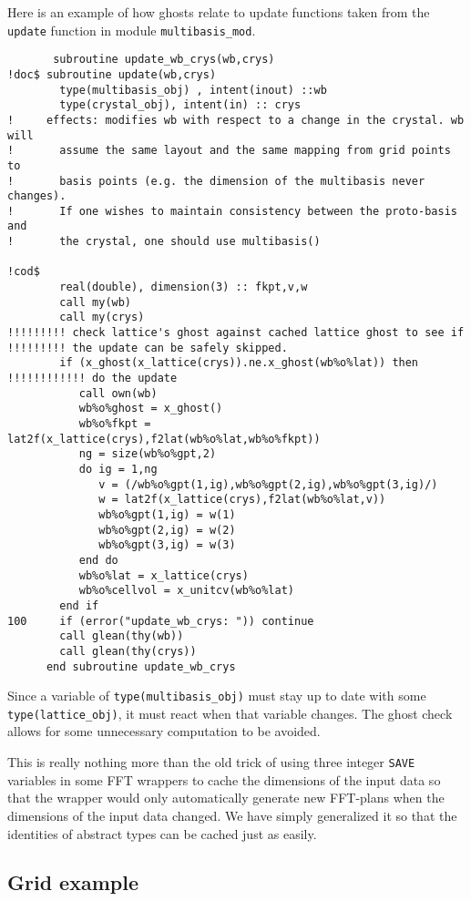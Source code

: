 Here is an example of how ghosts relate to update functions taken from the
\verb+update+ function in module \verb+multibasis_mod+.
\begin{verbatim}
       subroutine update_wb_crys(wb,crys)
!doc$ subroutine update(wb,crys)
        type(multibasis_obj) , intent(inout) ::wb
        type(crystal_obj), intent(in) :: crys
!     effects: modifies wb with respect to a change in the crystal. wb will
!       assume the same layout and the same mapping from grid points to
!       basis points (e.g. the dimension of the multibasis never changes).  
!       If one wishes to maintain consistency between the proto-basis and 
!       the crystal, one should use multibasis()

!cod$
        real(double), dimension(3) :: fkpt,v,w
        call my(wb)
        call my(crys)
!!!!!!!!! check lattice's ghost against cached lattice ghost to see if
!!!!!!!!! the update can be safely skipped.
        if (x_ghost(x_lattice(crys)).ne.x_ghost(wb%o%lat)) then
!!!!!!!!!!!! do the update
           call own(wb)
           wb%o%ghost = x_ghost()
           wb%o%fkpt = lat2f(x_lattice(crys),f2lat(wb%o%lat,wb%o%fkpt))
           ng = size(wb%o%gpt,2)
           do ig = 1,ng
              v = (/wb%o%gpt(1,ig),wb%o%gpt(2,ig),wb%o%gpt(3,ig)/)
              w = lat2f(x_lattice(crys),f2lat(wb%o%lat,v))
              wb%o%gpt(1,ig) = w(1)
              wb%o%gpt(2,ig) = w(2)
              wb%o%gpt(3,ig) = w(3)
           end do
           wb%o%lat = x_lattice(crys)
           wb%o%cellvol = x_unitcv(wb%o%lat)
        end if
100     if (error("update_wb_crys: ")) continue
        call glean(thy(wb))
        call glean(thy(crys))
      end subroutine update_wb_crys
\end{verbatim}
Since a variable of \verb+type(multibasis_obj)+ must stay
up to date with some \verb+type(lattice_obj)+, it must react
when that variable changes.  The ghost check allows for 
some unnecessary computation to be avoided.

This is really nothing more than the old trick of using three integer
\verb+SAVE+ variables in some FFT wrappers to cache the dimensions of the
input data so that the wrapper would only automatically generate new
FFT-plans when the dimensions of the input data changed.  We have
simply generalized it so that the identities of abstract types can be
cached just as easily.


\subsection{Grid example}

